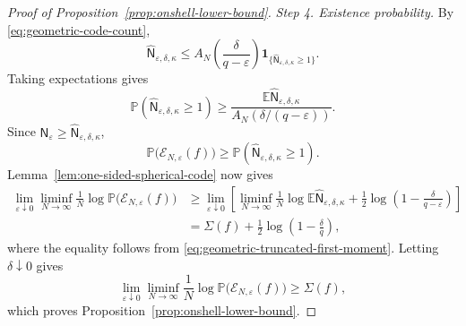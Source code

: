 \documentclass[10pt,a4paper]{amsart}
\newcommand{\dE}{\mathbb{E}}%
\newcommand{\dP}{\mathbb{P}}%
\newcommand{\mc}{\mathcal}
\newcommand{\ve}{\varepsilon}
\begin{document}
\begin{proof}[Proof of Proposition~\ref{prop:onshell-lower-bound}]
		\medskip\noindent\emph{Step 4. Existence probability.}
		By \eqref{eq:geometric-code-count},
		\[
		\widehat{\mathsf N}_{\ve,\delta,\kappa}
		\le
		A_N\left(
		\frac{\delta}{q-\ve}
		\right)
		\boldsymbol 1_{
			\{\widehat{\mathsf N}_{\ve,\delta,\kappa}\ge1\}
		}.
		\]
		Taking expectations gives
		\[
		\dP\left(
		\widehat{\mathsf N}_{\ve,\delta,\kappa}\ge1
		\right)
		\ge
		\frac{
			\dE\widehat{\mathsf N}_{\ve,\delta,\kappa}
		}{
			A_N\left(\delta/(q-\ve)\right)
		}.
		\]
		Since
		\(\mathsf N_\ve
		\ge\widehat{\mathsf N}_{\ve,\delta,\kappa}\),
		\[
		\dP\bigl(\mc E_{N,\ve}(f)\bigr)
		\ge
		\dP\left(
		\widehat{\mathsf N}_{\ve,\delta,\kappa}\ge1
		\right).
		\]
		Lemma~\ref{lem:one-sided-spherical-code} now gives
		\[
		\begin{aligned}
			\lim_{\ve\downarrow0}
			\liminf_{N\to\infty}
			\frac1N
			\log
			\dP\bigl(\mc E_{N,\ve}(f)\bigr)
			&\ge
			\lim_{\ve\downarrow0}
			\left[
			\liminf_{N\to\infty}
			\frac1N
			\log\dE\widehat{\mathsf N}_{\ve,\delta,\kappa}
			+
			\frac12\log\left(
			1-\frac{\delta}{q-\ve}
			\right)
			\right]\\
			&=
			\Sigma(f)
			+
			\frac12\log\left(1-\frac{\delta}{q}\right),
		\end{aligned}
		\]
		where the equality follows from
		\eqref{eq:geometric-truncated-first-moment}. Letting \(\delta\downarrow0\)
		gives
		\[
		\lim_{\ve\downarrow0}
		\liminf_{N\to\infty}
		\frac1N
		\log
		\dP\bigl(\mc E_{N,\ve}(f)\bigr)
		\ge
		\Sigma(f),
		\]
		which proves Proposition~\ref{prop:onshell-lower-bound}.
	\end{proof}
\end{document}

